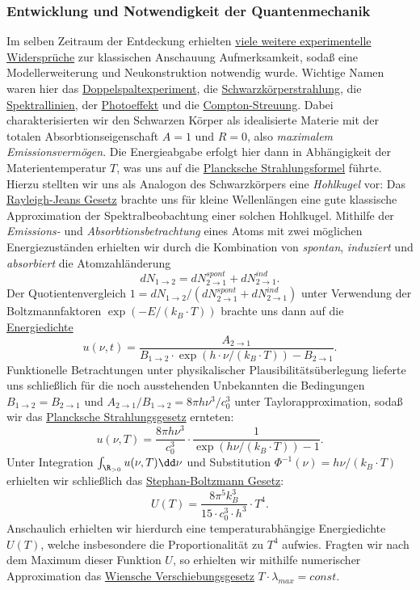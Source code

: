 \documentclass{subfiles}
\begin{document}
    \subsubsection*{Entwicklung und Notwendigkeit der Quantenmechanik}\label{Ub:AtomEigenschaften.iv}
        Im selben Zeitraum der Entdeckung erhielten \hyperref[Ub:EntwicklungQM]{viele weitere experimentelle Widersprüche} zur klassischen Anschauung Aufmerksamkeit, sodaß eine Modellerweiterung und Neukonstruktion notwendig wurde. Wichtige Namen waren hier das \hyperref[Ub:Doppelspaltexperiment]{Doppelspaltexperiment}, die \hyperref[sec:Schwarzkoerperstrahlung]{Schwarzkörperstrahlung}, die \hyperref[Ub:SpektralAufspaltung]{Spektrallinien}, der \hyperref[subsec:Photoeffekt]{Photoeffekt} und die \hyperref[subsubsec:ComptonEffekt]{Compton-Streuung}. Dabei charakterisierten wir den Schwarzen Körper als idealisierte Materie mit der totalen Absorbtionseigenschaft $A = 1$ und $R = 0$, also \emph{maximalem Emissionsvermögen}. Die Energieabgabe erfolgt hier dann in Abhängigkeit der Materientemperatur $T$, was uns auf die \hyperref[Ub:PlanckschesStrahlungsgesetz]{Plancksche Strahlungsformel} führte. Hierzu stellten wir uns als Analogon des Schwarzkörpers eine \emph{Hohlkugel} vor: Das \hyperref[eq:RayleighJeans]{Rayleigh-Jeans Gesetz} brachte uns für kleine Wellenlängen eine gute klassische Approximation der Spektralbeobachtung einer solchen Hohlkugel. Mithilfe der \emph{Emissions-} und \emph{Absorbtionsbetrachtung} eines Atoms mit zwei möglichen Energiezuständen erhielten wir durch die Kombination von \emph{spontan}, \emph{induziert} und \emph{absorbiert} die Atomzahländerung
        \[
            dN_{1\to 2} = dN_{2\to 1}^\textit{spont} + dN_{2\to 1}^\textit{ind}.
        \]
        Der Quotientenvergleich $1 = dN_{1\to 2}/(dN_{2\to 1}^\textit{spont} + dN_{2\to 1}^\textit{ind})$ unter Verwendung der Boltzmannfaktoren $\exp(-E/(k_B\cdot T))$ brachte uns dann auf die \hyperref[eq:PlanckEnergieDichte]{Energiedichte} 
        \[
            u(\nu,t) = \frac{A_{2\to 1}}{B_{1\to 2}\cdot\exp(h\cdot\nu/(k_B\cdot T)) - B_{2\to 1}}.
        \]
        Funktionelle Betrachtungen unter physikalischer Plausibilitätsüberlegung lieferte uns schließlich für die noch ausstehenden Unbekannten die Bedingungen $B_{1\to 2} = B_{2\to 1}$ und $A_{2\to 1}/B_{1\to 2} = 8\pi h\nu^3/c_0^3$ unter Taylorapproximation, sodaß wir das \hyperref[eq:PlanckEnergieDichte]{Plancksche Strahlungsgesetz} ernteten:
        \[
            u(\nu,T) = \frac{8\pi h\nu^3}{c_0^3}\cdot\frac{1}{\exp(h\nu/(k_B\cdot T)) - 1}.
        \]
        Unter Integration $\int_{\R_{>0}} u(\nu,T)\dd\nu$ und Substitution $\Phi^{-1}(\nu) = h\nu/(k_B\cdot T)$ erhielten wir schließlich das \hyperref[eq:StephanBoltzmann]{Stephan-Boltzmann Gesetz}:
        \[
            U(T) = \frac{8\pi^5 k_B^3}{15\cdot c_0^3\cdot h^3}\cdot T^4.
        \] 
        Anschaulich erhielten wir hierdurch eine temperaturabhängige Energiedichte $U(T)$, welche insbesondere die Proportionalität zu $T^4$ aufwies. Fragten wir nach dem Maximum dieser Funktion $U$, so erhielten wir mithilfe numerischer Approximation das \hyperref[eq:WienscheVerschiebungsgesetz]{Wiensche Verschiebungsgesetz} $T\cdot\lambda_\textit{max} = \textit{const}.$
\end{document}
